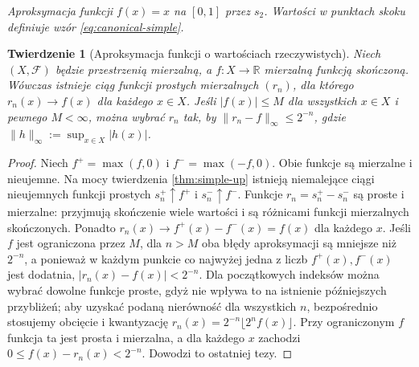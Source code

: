 \documentclass[11pt,a4paper,oneside]{book}
\numberwithin{equation}{chapter}
\theoremstyle{plain}
\newtheorem{twierdzenie}{Twierdzenie}[chapter]
\theoremstyle{definition}
\theoremstyle{remark}
\begin{document}
\begin{center}

\smallskip
\emph{Aproksymacja funkcji $f(x)=x$ na $[0,1]$ przez $s_2$.
Wartości w punktach skoku definiuje wzór \eqref{eq:canonical-simple}.}
\end{center}

\begin{twierdzenie}[Aproksymacja funkcji o wartościach rzeczywistych]
\label{thm:simple-real-approx}
Niech $(X,\mathcal F)$ będzie przestrzenią mierzalną,
a $f:X\to\mathbb R$ mierzalną funkcją skończoną.
Wówczas istnieje ciąg funkcji prostych mierzalnych
$(r_n)$, dla którego $r_n(x)\to f(x)$ dla każdego $x\in X$.
Jeśli $|f(x)|\le M$ dla wszystkich $x\in X$ i pewnego
$M<\infty$, można wybrać $r_n$ tak, by
$\|r_n-f\|_\infty\le2^{-n}$, gdzie
$\|h\|_\infty:=\sup_{x\in X}|h(x)|$.
\end{twierdzenie}
\begin{proof}
Niech $f^+=\max(f,0)$ i $f^-=\max(-f,0)$.
Obie funkcje są mierzalne i nieujemne.
Na mocy twierdzenia \ref{thm:simple-up} istnieją
niemalejące ciągi nieujemnych funkcji prostych
$s_n^+\uparrow f^+$ i $s_n^-\uparrow f^-$.
Funkcje $r_n=s_n^+-s_n^-$ są proste i mierzalne:
przyjmują skończenie wiele wartości i są różnicami
funkcji mierzalnych skończonych. Ponadto
$r_n(x)\to f^+(x)-f^-(x)=f(x)$ dla każdego $x$.
Jeśli $f$ jest ograniczona przez $M$, dla
$n>M$ oba błędy aproksymacji są mniejsze niż
$2^{-n}$, a ponieważ w każdym punkcie co najwyżej
jedna z liczb $f^+(x),f^-(x)$ jest dodatnia,
$|r_n(x)-f(x)|<2^{-n}$. Dla początkowych indeksów
można wybrać dowolne funkcje proste, gdyż nie
wpływa to na istnienie późniejszych przybliżeń;
aby uzyskać podaną nierówność dla wszystkich $n$,
bezpośrednio stosujemy obcięcie i kwantyzację
$r_n(x)=2^{-n}\lfloor2^nf(x)\rfloor$.
Przy ograniczonym $f$ funkcja ta jest prosta i
mierzalna, a dla każdego $x$ zachodzi
$0\le f(x)-r_n(x)<2^{-n}$. Dowodzi to ostatniej tezy.
\end{proof}
\end{document}
